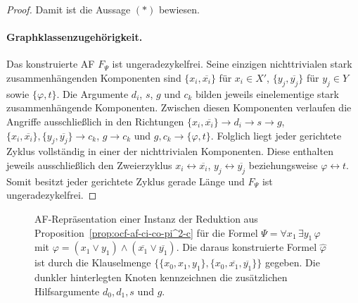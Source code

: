 \begin{proof}
    Damit ist die Aussage \((*)\) bewiesen.

    \paragraph{Graphklassenzugehörigkeit.}
    Das konstruierte AF \(F_{\Psi}\) ist ungeradezykelfrei. 
    Seine einzigen nichttrivialen stark zusammenhängenden Komponenten sind
    \(\{x_i,\overline{x_i}\}\) für \(x_i\in X'\),
    \(\{y_j,\overline{y_j}\}\) für \(y_j\in Y\) sowie
    \(\{\varphi,t\}\).
    Die Argumente \(d_i\), \(s\), \(g\) und \(c_k\) bilden jeweils
    einelementige stark zusammenhängende Komponenten.
    Zwischen diesen Komponenten verlaufen die Angriffe ausschließlich in den
    Richtungen
    \(\{x_i,\overline{x_i}\}\to d_i\to s\to g\),
    \(\{x_i,\overline{x_i}\},\{y_j,\overline{y_j}\}\to c_k\),
    \(g\to c_k\) und
    \(g,c_k\to\{\varphi,t\}\).
    Folglich liegt jeder gerichtete Zyklus vollständig in einer der
    nichttrivialen Komponenten. Diese enthalten jeweils ausschließlich den
    Zweierzyklus
    \(x_i\leftrightarrow\overline{x_i}\),
    \(y_j\leftrightarrow\overline{y_j}\) beziehungsweise
    \(\varphi\leftrightarrow t\).
    Somit besitzt jeder gerichtete Zyklus gerade Länge und
    \(F_{\Psi}\) ist ungeradezykelfrei.
\end{proof}

\begin{figure}
    \centering
    \resizebox{\textwidth}{!}{
        
    }
    \caption[Reduktion für \emph{complete}-Unabhängigkeit]{
    AF-Repräsentation einer Instanz der Reduktion aus
    Proposition~\ref{prop:ocf-af-ci-co-pi^2-c}
    für die Formel
    \(\Psi=\forall x_1\,\exists y_1\,\varphi\) mit
    \(\varphi=(x_1\lor y_1)
    \land(\overline{x_1}\lor\overline{y_1})\).
    Die daraus konstruierte Formel \(\widehat{\varphi}\)
    ist durch die Klauselmenge
    \(\{\{x_0,x_1,y_1\},
    \{x_0,\overline{x_1},\overline{y_1}\}\}\)
    gegeben. Die dunkler hinterlegten Knoten kennzeichnen
    die zusätzlichen Hilfsargumente \(d_0,d_1,s\) und \(g\).
    }
\label{fig:reduktion-complete}
\end{figure}



